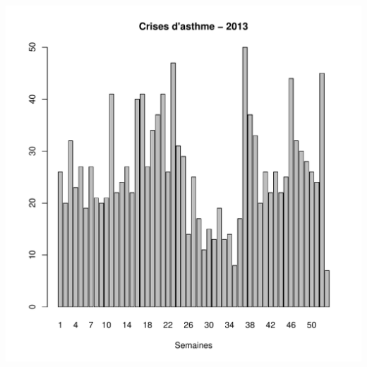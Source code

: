 \documentclass[12pt,english,french,twoside]{book}\usepackage[]{graphicx}\usepackage[]{color}
\makeatletter
\def\maxwidth{ %
  \ifdim\Gin@nat@width>\linewidth
    \linewidth
  \else
    \Gin@nat@width
  \fi
}
\makeatother
\begin{document}
\includegraphics[width=\maxwidth]{figure/asthme21} 
\end{document}
